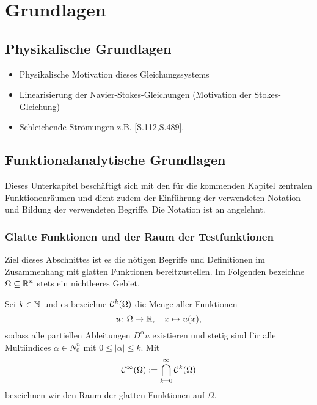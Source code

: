 \chapter{Grundlagen}
\label{cp:grundlagen}

\section{Physikalische Grundlagen}

\begin{itemize}
  \item Physikalische Motivation dieses Gleichungssystems
  \item Linearisierung der Navier-Stokes-Gleichungen (Motivation der Stokes-Gleichung)
  \item Schleichende Strömungen z.B. \cite{spurk10stroemungslehre}[S.112,S.489]. 
\end{itemize}

\section{Funktionalanalytische Grundlagen}

Dieses Unterkapitel beschäftigt sich mit den für die kommenden Kapitel zentralen Funktionenräumen und dient zudem der Einführung der verwendeten Notation und Bildung der verwendeten Begriffe.
Die Notation ist an \cite{sohr2001navier} angelehnt.

\subsection{Glatte Funktionen und der Raum der Testfunktionen}
\label{subsec:smooth}

Ziel dieses Abschnittes ist es die nötigen Begriffe und Definitionen im Zusammenhang mit glatten Funktionen bereitzustellen.
Im Folgenden bezeichne $\Omega \subseteq \mathbb{R}^n$ stets ein nichtleeres Gebiet.

Sei $k \in \mathbb{N}$ und es bezeichne $\mathcal{C}^k(\Omega)$ die Menge aller Funktionen
$$
u \colon \Omega \to \mathbb{R}, \quad x \mapsto u(x),
$$
sodass alle partiellen Ableitungen $D^\alpha u$ existieren und stetig sind für alle Multiindices $\alpha \in N_0^n$ mit $0 \leq |\alpha| \leq k$. Mit
$$
  \mathcal{C}^\infty(\Omega) := \bigcap_{k = 0}^\infty \mathcal{C}^k(\Omega)
$$
bezeichnen wir den Raum der glatten Funktionen auf $\Omega$.

